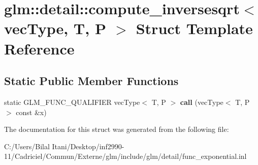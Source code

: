 \hypertarget{structglm_1_1detail_1_1compute__inversesqrt}{}\section{glm\+:\+:detail\+:\+:compute\+\_\+inversesqrt$<$ vec\+Type, T, P $>$ Struct Template Reference}
\label{structglm_1_1detail_1_1compute__inversesqrt}
\subsection*{Static Public Member Functions}
\begin{DoxyCompactItemize}
\item 
static G\+L\+M\+\_\+\+F\+U\+N\+C\+\_\+\+Q\+U\+A\+L\+I\+F\+I\+ER vec\+Type$<$ T, P $>$ {\bfseries call} (vec\+Type$<$ T, P $>$ const \&x)\hypertarget{structglm_1_1detail_1_1compute__inversesqrt_a691942b1bfc04c3563e179ff2fef5375}{}\label{structglm_1_1detail_1_1compute__inversesqrt_a691942b1bfc04c3563e179ff2fef5375}

\end{DoxyCompactItemize}


The documentation for this struct was generated from the following file\+:\begin{DoxyCompactItemize}
\item 
C\+:/\+Users/\+Bilal Itani/\+Desktop/inf2990-\/11/\+Cadriciel/\+Commun/\+Externe/glm/include/glm/detail/func\+\_\+exponential.\+inl\end{DoxyCompactItemize}
